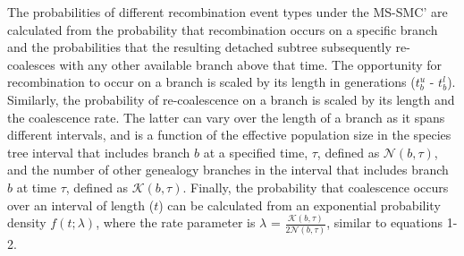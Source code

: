 \documentclass[11pt]{article}
\begin{document}




The probabilities of different recombination event types under the 
MS-SMC' are calculated from the probability that recombination occurs on 
a specific branch and the probabilities that the resulting detached 
subtree subsequently re-coalesces with any other available branch above that time. 
The opportunity for recombination to occur on a branch is scaled by 
its length in generations ($t_b^u$ - $t_b^l$). Similarly, the 
probability of re-coalescence on a branch is scaled by its length
and the coalescence rate. The latter can vary over the length of a branch
as it spans different intervals, and is a function of the effective 
population size in the species tree interval that includes branch $b$ at
a specified time, $\tau$, defined as $\mathcal{N}(b,\tau)$, and the number of 
other genealogy branches in the interval that includes branch $b$ at time $\tau$,
defined as $\mathcal{K}(b,\tau)$.
Finally, the probability that coalescence occurs over an interval of length ($t$) 
can be calculated from an exponential probability density $f(t; \lambda)$, 
where the rate parameter is $\lambda$ = $\frac{\mathcal{K}(b,\tau)}{2\mathcal{N}(b,\tau)}$, 
similar to equations 1-2. 
\end{document}
